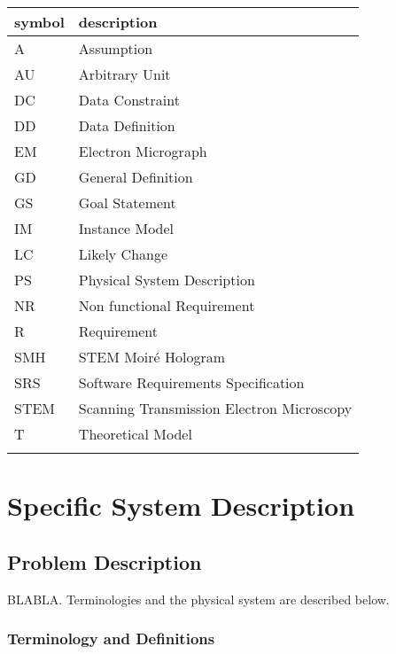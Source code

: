 \documentclass[12pt]{article}
\begin{document}
\renewcommand{\arraystretch}{1.2}
\begin{tabular}{l l} 
  \toprule		
  \textbf{symbol} & \textbf{description}\\
  \midrule 
  A & Assumption\\
  AU & Arbitrary Unit\\
  DC & Data Constraint \\
  DD & Data Definition\\
  EM & Electron Micrograph \\
  GD & General Definition\\
  GS & Goal Statement\\
  IM & Instance Model\\
  LC & Likely Change\\
  PS & Physical System Description\\
  NR & Non functional Requirement\\
  R & Requirement\\
  SMH & STEM Moir{\'e} Hologram \\
  SRS & Software Requirements Specification\\
  STEM & Scanning Transmission Electron Microscopy \\
  T & Theoretical Model\\
  \bottomrule
  \label{table_acro_SRS}
\end{tabular}

\newpage
{}

\section{Specific System Description}
\subsection{Problem Description} \label{Sec_pd}

BLABLA. Terminologies and the physical system are 
described below.

\subsubsection{Terminology and Definitions}
\end{document}
